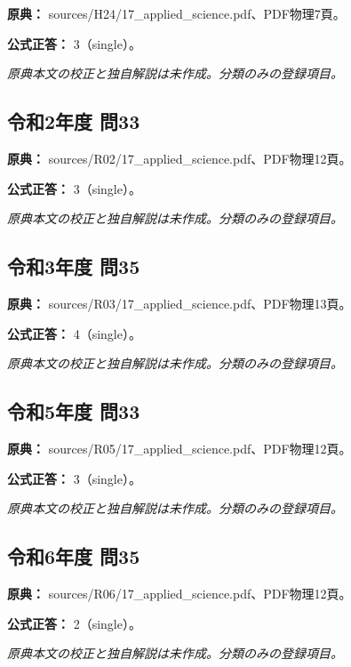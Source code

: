 \noindent\textbf{原典：} sources/H24/17\_applied\_science.pdf、PDF物理7頁。

\textbf{公式正答：} 3（single）。

\par\textit{原典本文の校正と独自解説は未作成。分類のみの登録項目。}

\subsection{令和2年度 問33}
\label{q:r02-reg-applied-33}

\noindent\textbf{原典：} sources/R02/17\_applied\_science.pdf、PDF物理12頁。

\textbf{公式正答：} 3（single）。

\par\textit{原典本文の校正と独自解説は未作成。分類のみの登録項目。}

\subsection{令和3年度 問35}
\label{q:r03-reg-applied-35}

\noindent\textbf{原典：} sources/R03/17\_applied\_science.pdf、PDF物理13頁。

\textbf{公式正答：} 4（single）。

\par\textit{原典本文の校正と独自解説は未作成。分類のみの登録項目。}

\subsection{令和5年度 問33}
\label{q:r05-reg-applied-33}

\noindent\textbf{原典：} sources/R05/17\_applied\_science.pdf、PDF物理12頁。

\textbf{公式正答：} 3（single）。

\par\textit{原典本文の校正と独自解説は未作成。分類のみの登録項目。}

\subsection{令和6年度 問35}
\label{q:r06-reg-applied-35}

\noindent\textbf{原典：} sources/R06/17\_applied\_science.pdf、PDF物理12頁。

\textbf{公式正答：} 2（single）。

\par\textit{原典本文の校正と独自解説は未作成。分類のみの登録項目。}

